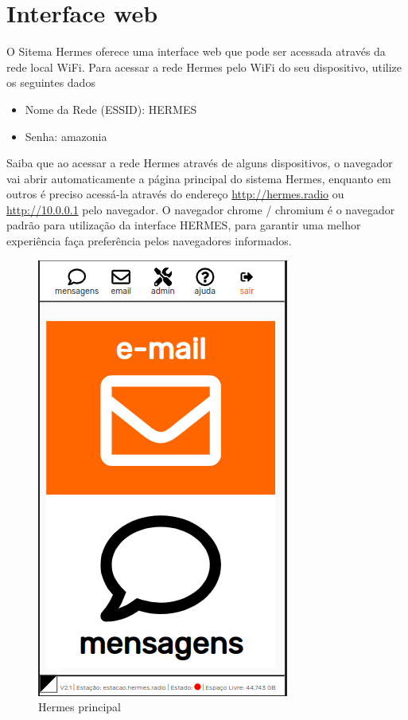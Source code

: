 \documentclass[11pt,a4paper]{article}
\begin{document}
\section{Interface web}

O Sitema Hermes oferece uma interface web que pode ser acessada através da rede local WiFi. Para acessar a rede Hermes pelo WiFi do seu dispositivo, utilize os seguintes dados 
\begin{itemize}
    \item Nome da Rede (ESSID): HERMES
    \item Senha: amazonia
\end{itemize}

Saiba que ao acessar a rede Hermes através de alguns dispositivos, o navegador vai abrir automaticamente a página principal do sistema Hermes, enquanto em outros é preciso acessá-la através do endereço \url{http://hermes.radio} ou \url{http://10.0.0.1} pelo navegador.
\linebreak
\linebreak
O navegador chrome / chromium é o navegador padrão para utilização da interface HERMES, para garantir uma melhor experiência faça preferência pelos navegadores informados.

   \begin{figure}[H]
    \centering
    \includegraphics[width=0.5\columnwidth]{screenshots/frontend/pt_kn/landing.png}
    \caption{Hermes principal}
    \label{fig:interface}
    \end{figure}
\end{document}
